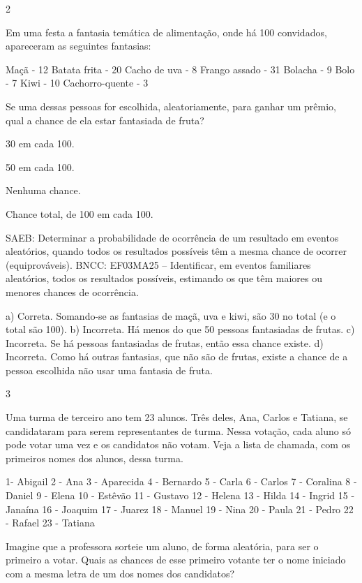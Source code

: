 \begin{escolha}
{\begin{escolha}
\num{2}

Em uma festa a fantasia temática de alimentação, onde há 100 convidados, apareceram as seguintes fantasias:

Maçã - 12
Batata frita - 20
Cacho de uva - 8
Frango assado - 31
Bolacha - 9
Bolo - 7
Kiwi - 10
Cachorro-quente - 3

  Se uma dessas pessoas for escolhida, aleatoriamente, para ganhar um prêmio, qual a chance de ela estar fantasiada de fruta?


\begin{escolha}
\item
30 em cada 100.
\item
50 em cada 100.
\item
Nenhuma chance.
\item
Chance total, de 100 em cada 100.
\end{escolha}

SAEB: Determinar a probabilidade de ocorrência de um resultado em eventos aleatórios, quando todos os resultados possíveis têm a mesma chance de ocorrer (equiprováveis).  
BNCC: EF03MA25 -- Identificar, em eventos familiares aleatórios, todos os resultados possíveis,
estimando os que têm maiores ou menores chances de ocorrência.

a) Correta. Somando-se as fantasias de maçã, uva e kiwi, são 30 no total (e o total são 100).
b) Incorreta. Há menos do que 50 pessoas fantasiadas de frutas.
c) Incorreta. Se há pessoas fantasiadas de frutas, então essa chance existe.
d) Incorreta. Como há outras fantasias, que não são de frutas, existe a chance de a pessoa escolhida não usar uma fantasia de fruta.

\num{3}

Uma turma de terceiro ano tem 23 alunos. Três deles, Ana, Carlos e Tatiana, se candidataram para serem representantes de turma. Nessa votação, cada aluno só pode votar uma vez e os candidatos não votam. Veja a lista de chamada, com os primeiros nomes dos alunos, dessa turma.

1- Abigail
2 - Ana
3 - Aparecida
4 - Bernardo
5 - Carla
6 - Carlos
7 - Coralina
8 - Daniel 
9 - Elena
10 - Estêvão
11 - Gustavo
12 - Helena
13 - Hilda
14 - Ingrid
15 - Janaína
16 - Joaquim
17 - Juarez
18 - Manuel
19 - Nina
20 - Paula
21 - Pedro
22 - Rafael
23 - Tatiana

Imagine que a professora sorteie um aluno, de forma aleatória, para ser o primeiro a votar. Quais as chances de esse primeiro votante ter o nome iniciado com a mesma letra de um dos nomes dos candidatos?



\end{escolha}}
\end{escolha}
